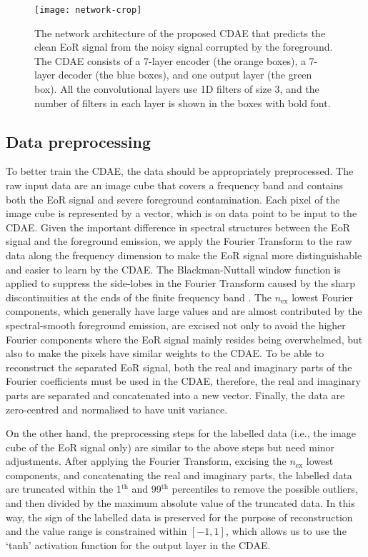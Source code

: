 \documentclass[letters,a4paper,fleqn,usenatbib]{mnras}
\newcommand{\R}[1]{\mathrm{#1}}
\begin{document}
\begin{figure}
  \centering
  \texttt{[image: network-crop]}
  \caption{\label{fig:network}%
    The network architecture of the proposed CDAE that
    predicts the clean EoR signal from the noisy signal corrupted by
    the foreground.
    The CDAE consists of a 7-layer encoder (the orange boxes),
    a 7-layer decoder (the blue boxes), and one output layer
    (the green box).
    All the convolutional layers use 1D filters of size 3, and
    the number of filters in each layer is shown in the boxes
    with bold font.}
\end{figure}


\subsection{Data preprocessing}
\label{sec:data}

To better train the CDAE, the data should be appropriately preprocessed.
The raw input data are an image cube that covers a frequency band and
contains both the EoR signal and severe foreground contamination.
Each pixel of the image cube is represented by a vector, which is on
data point to be input to the CDAE.
Given the important difference in spectral structures between the EoR
signal and the foreground emission, we apply the Fourier Transform to
the raw data along the frequency dimension to make the EoR signal more
distinguishable and easier to learn by the CDAE.
The Blackman-Nuttall window function is applied to suppress the side-lobes
in the Fourier Transform caused by the sharp discontinuities at the ends
of the finite frequency band \citep[e.g.,][]{chapman2016}.
The $n_{\R{ex}}$ lowest Fourier components, which generally have large
values and are almost contributed by the spectral-smooth foreground
emission, are excised not only to avoid the higher Fourier components
where the EoR signal mainly resides being overwhelmed, but also to
make the pixels have similar weights to the CDAE.
To be able to reconstruct the separated EoR signal, both the real and
imaginary parts of the Fourier coefficients must be used in the CDAE,
therefore, the real and imaginary parts are separated and concatenated
into a new vector.
Finally, the data are zero-centred and normalised to have unit variance.

On the other hand, the preprocessing steps for the labelled data (i.e.,
the image cube of the EoR signal only) are similar to the above steps
but need minor adjustments.
After applying the Fourier Transform, excising the $n_{\R{ex}}$ lowest
components, and concatenating the real and imaginary parts,
the labelled data are truncated within the 1$^{\R{th}}$ and 99$^{\R{th}}$
percentiles to remove the possible outliers, and then divided by the
maximum absolute value of the truncated data.
In this way, the sign of the labelled data is preserved for the purpose
of reconstruction and the value range is constrained within $[-1, 1]$,
which allows us to use the `tanh' activation function for the output
layer in the CDAE.
\end{document}
